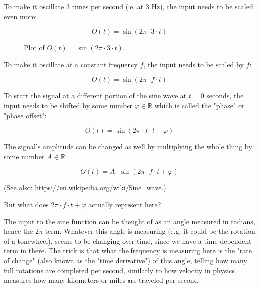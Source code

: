 \documentclass{article}
\begin{document}
    To make it oscillate 3 times per second (ie. at 3 Hz), the input needs to be
    scaled even more:

    \begin{equation}
      O(t) = \sin(2\pi \cdot 3 \cdot t)
    \end{equation}

    \begin{figure}[!htb]
      \centering
      \caption{%
        Plot of $O(t) = \sin(2\pi \cdot 3 \cdot t)$.
      }
    \end{figure}

    To make it oscillate at a constant frequency $f$, the input needs to be
    scaled by $f$:

    \begin{equation}
      O(t) = \sin(2\pi \cdot f \cdot t)
    \end{equation}

    To start the signal at a different portion of the sine wave at $t = 0$
    seconds, the input needs to be shifted by some number
    $\varphi \in \mathbb{R}$ which is called the "phase" or "phase offset":

    \begin{equation}
      O(t) = \sin(2\pi \cdot f \cdot t + \varphi)
    \end{equation}

    The signal's amplitude can be changed as well by multiplying the whole thing
    by some number $A \in \mathbb{R}$:

    \begin{equation}
      O(t) = A \cdot \sin(2\pi \cdot f \cdot t + \varphi)
    \end{equation}

    (See also: \url{https://en.wikipedia.org/wiki/Sine\_wave}.)

    But what does $2\pi \cdot f \cdot t + \varphi$ actually represent here?

    The input to the sine function can be thought of as an angle measured in
    radians, hence the $2\pi$ term. Whatever this angle is measuring (e.g. it
    could be the rotation of a tonewheel), seems to be changing over time,
    since we have a time-dependent term in there. The trick is that what the
    frequency is measuring here is the "rate of change" (also known as the "time
    derivative") of this angle, telling how many full rotations are completed
    per second, similarly to how velocity in physics measures how many
    kilometers or miles are traveled per second.
\end{document}
